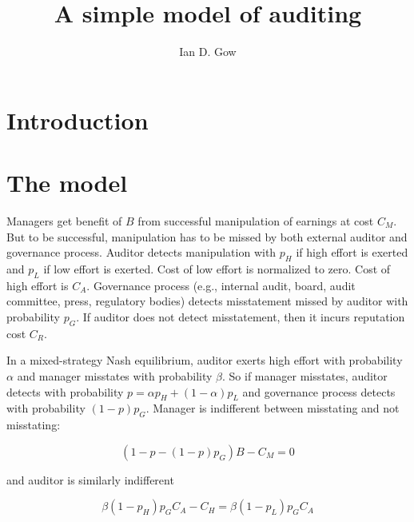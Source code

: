\documentclass[11pt]{amsart}
\title[Audit model]{A simple model of auditing}
\author{Ian D. Gow}
\begin{document}

\section{Introduction}

\section{The model}

Managers get benefit of $B$ from successful manipulation of earnings at cost $C_M$. But to be successful, manipulation has to be missed by both external auditor and governance process. Auditor detects manipulation with $p_H$ if high effort is exerted and $p_L$ if low effort is exerted. Cost of low effort is normalized to zero. Cost of high effort is $C_A$. Governance process (e.g., internal audit, board, audit committee, press, regulatory bodies) detects misstatement missed by auditor with probability $p_G$. If auditor does not detect misstatement, then it incurs reputation cost $C_R$.


In a mixed-strategy Nash equilibrium, auditor exerts high effort with probability $\alpha$ and manager misstates with probability $\beta$. So if manager misstates, auditor detects with probability $p = \alpha p_H + (1-\alpha) p_L$ and governance process detects with probability $(1-p) p_G$. Manager is indifferent between misstating and not misstating:

\[ (1 - p - (1-p) p_G) B - C_M = 0 \]

and auditor is similarly indifferent

\[ \beta (1-p_H) p_G C_A - C_H = \beta (1-p_L) p_G C_A \]


\end{document}
